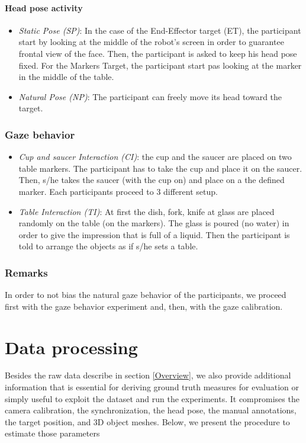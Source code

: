 \documentclass[11pt,a4paper]{article}
\begin{document}
\paragraph{Head pose activity}
\begin{itemize}
\item \textit{Static Pose (SP)}: In the case of the End-Effector target (ET), the participant start by looking at the middle of the robot's screen in order to guarantee frontal view of the face. Then, the participant is asked to keep his head pose fixed. For the Markers Target, the participant start pas looking at the marker in the middle of the table.
\item \textit{Natural Pose (NP)}: The participant can freely move its head toward the target.
\end{itemize}
\subsubsection{Gaze behavior}
\begin{itemize}
\item \textit{Cup and saucer Interaction (CI)}: the cup and the saucer are placed on two table markers. The participant has to take the cup and place it on the saucer. Then, s/he takes the saucer (with the cup on) and place on a the defined marker. Each participants proceed to 3 different setup.
\item \textit{Table Interaction (TI)}: At first the dish, fork, knife at glass are placed randomly on the table (on the markers). The glass is poured (no water) in order to give the impression that is full of a liquid. Then the participant is told to arrange the objects as if s/he sets a table.
\end{itemize}

\subsubsection{Remarks}
In order to not bias the natural gaze behavior of the participants, we proceed first with the gaze behavior experiment and, then, with the gaze calibration.

\section{Data processing}
Besides the raw data describe in section \ref{Overview}, we also provide additional information that is essential for deriving ground truth measures for evaluation or simply useful to exploit the dataset and run the experiments. It compromises the camera calibration, the synchronization, the head pose, the manual annotations, the target position, and 3D object meshes. Below, we present the procedure to estimate those parameters
\end{document}
